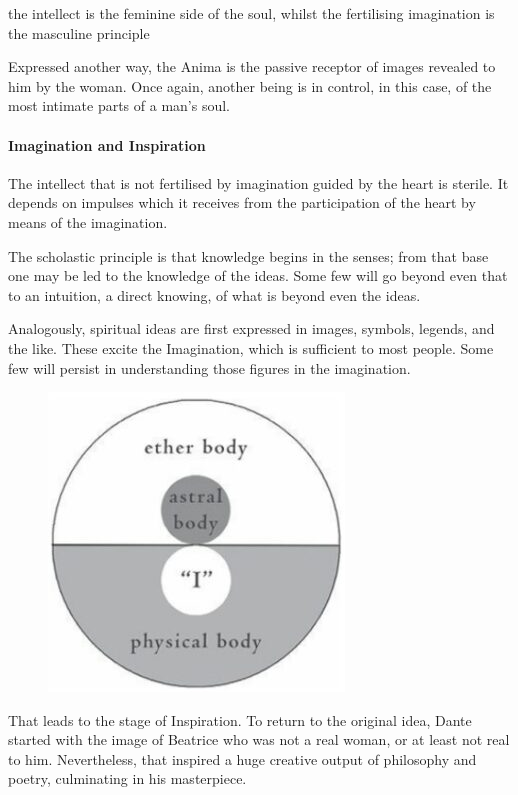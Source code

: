 \begin{quotex}
the intellect is the feminine side of the soul, whilst the fertilising imagination is the masculine principle 

\end{quotex}
Expressed another way, the Anima is the passive receptor of images revealed to him by the woman. Once again, another being is in control, in this case, of the most intimate parts of a man's soul.

\paragraph{Imagination and Inspiration}
\begin{quotex}
The intellect that is not fertilised by imagination guided by the heart is sterile. It depends on impulses which it receives from the participation of the heart by means of the imagination. 

\end{quotex}
The scholastic principle is that knowledge begins in the senses; from that base one may be led to the knowledge of the ideas. Some few will go beyond even that to an intuition, a direct knowing, of what is beyond even the ideas.

Analogously, spiritual ideas are first expressed in images, symbols, legends, and the like. These excite the Imagination, which is sufficient to most people. Some few will persist in understanding those figures in the imagination.
\begin{figure}
 \includegraphics[scale=.5]{a20201211FaithfultoLove-img001.jpg}
\end{figure}
That leads to the stage of Inspiration. To return to the original idea, Dante started with the image of Beatrice who was not a real woman, or at least not real to him. Nevertheless, that inspired a huge creative output of philosophy and poetry, culminating in his masterpiece.

